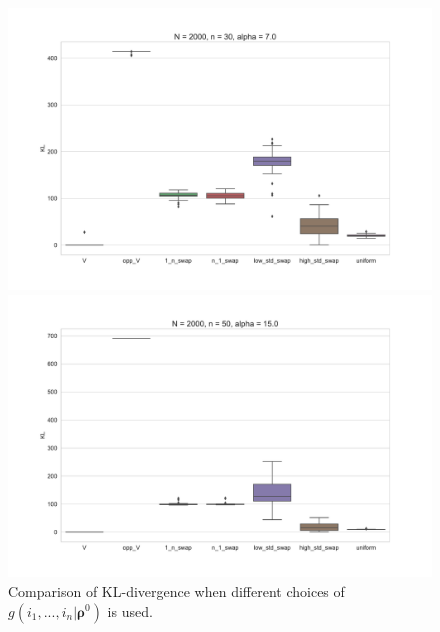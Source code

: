 \documentclass[11pt, oneside]{article}   	%
\begin{document}
\begin{figure}[h!]
		\begin{minipage}[t]{.45\textwidth}
			\centering
			\includegraphics[width=\textwidth]{figures/theorem2_2/N2000n30alpha7.pdf}
			
		\end{minipage}
		\hfill
		\begin{minipage}[t]{.45\textwidth}
			\centering
			\includegraphics[width=\textwidth]{figures/theorem2_2/N2000n50alpha15.pdf}
			
		\end{minipage} 
	
	
	\caption{Comparison of KL-divergence when different choices of $g(i_1, ...,i_n|\bm{\rho}^0)$ is used. }
	\label{fig:boxPlots}
\end{figure}
\end{document}
